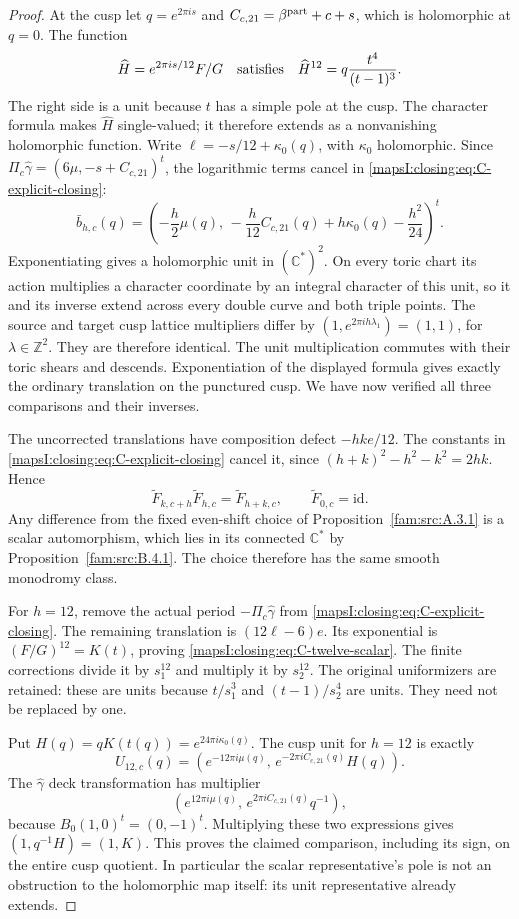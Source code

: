 \begin{proof}
At the cusp let \(q=e^{2\pi i s}\) and
\(C_{c,21}=\beta^{\rm part}+c+s\), which is holomorphic at
\(q=0\). The function
\[
 \widehat H=e^{2\pi i s/12}F/G
 \quad\hbox{satisfies}\quad
 \widehat H^{12}=q\frac{t^4}{(t-1)^3}.
\]
The right side is a unit because \(t\) has a simple pole at the
cusp. The character formula makes \(\widehat H\) single-valued;
it therefore extends as a nonvanishing holomorphic function. Write
\(\ell=-s/12+\kappa_0(q)\), with \(\kappa_0\) holomorphic.
Since
\(\Pi_c\widehat\gamma=(6\mu,-s+C_{c,21})^t\),
the logarithmic terms cancel in \eqref{mapsI:closing:eq:C-explicit-closing}:
\[
 \bar b_{h,c}(q)=
 \left(-\frac h2\mu(q),\,
 -\frac h{12}C_{c,21}(q)+h\kappa_0(q)-\frac{h^2}{24}\right)^t.
\]
Exponentiating gives a holomorphic unit in \((\mathbb C^*)^2\).
On every toric chart its action multiplies a character coordinate
by an integral character of this unit, so it and its inverse
extend across every double curve and both triple points. The
source and target cusp lattice multipliers differ by
\((1,e^{2\pi i h\lambda_1})=(1,1)\), for
\(\lambda\in\mathbb Z^2\). They are therefore identical. The
unit multiplication commutes with their toric shears and descends.
Exponentiation of the displayed formula gives exactly the ordinary
translation on the punctured cusp. We have now verified all
three comparisons and their inverses.

The uncorrected translations have composition defect
\(-hk e/12\). The constants in
\eqref{mapsI:closing:eq:C-explicit-closing} cancel it, since
\((h+k)^2-h^2-k^2=2hk\). Hence
\[
 \widetilde F_{k,c+h}\widetilde F_{h,c}
       =\widetilde F_{h+k,c},\qquad
 \widetilde F_{0,c}=\mathrm{id}.
\]
Any difference from the fixed even-shift choice of Proposition~\ref{fam:src:A.3.1} is a scalar automorphism,
which lies in its connected $\mathbb C^*$ by Proposition~\ref{fam:src:B.4.1}. The choice therefore
has the same smooth monodromy class.

For \(h=12\), remove the actual period
\(-\Pi_c\widehat\gamma\) from \eqref{mapsI:closing:eq:C-explicit-closing}.
The remaining translation is \((12\ell-6)e\). Its exponential
is \((F/G)^{12}=K(t)\), proving
\eqref{mapsI:closing:eq:C-twelve-scalar}. The finite corrections divide it by
\(s_1^{12}\) and multiply it by \(s_2^{12}\). The original
uniformizers are retained: these are units because
\(t/s_1^3\) and \((t-1)/s_2^4\) are units. They need not be
replaced by one.

Put \(H(q)=qK(t(q))=e^{24\pi i\kappa_0(q)}\). The cusp unit
for \(h=12\) is exactly
\[
 U_{12,c}(q)=
 \left(e^{-12\pi i\mu(q)},\,
       e^{-2\pi i C_{c,21}(q)}H(q)\right).
\]
The \(\widehat\gamma\) deck transformation has multiplier
\[
 \left(e^{12\pi i\mu(q)},\,
       e^{2\pi i C_{c,21}(q)}q^{-1}\right),
\]
because \(B_0(1,0)^t=(0,-1)^t\). Multiplying these two
expressions gives \((1,q^{-1}H)=(1,K)\). This proves the
claimed comparison, including its sign, on the entire cusp
quotient. In particular the scalar representative's pole is not
an obstruction to the holomorphic map itself: its unit
representative already extends.


\end{proof}
